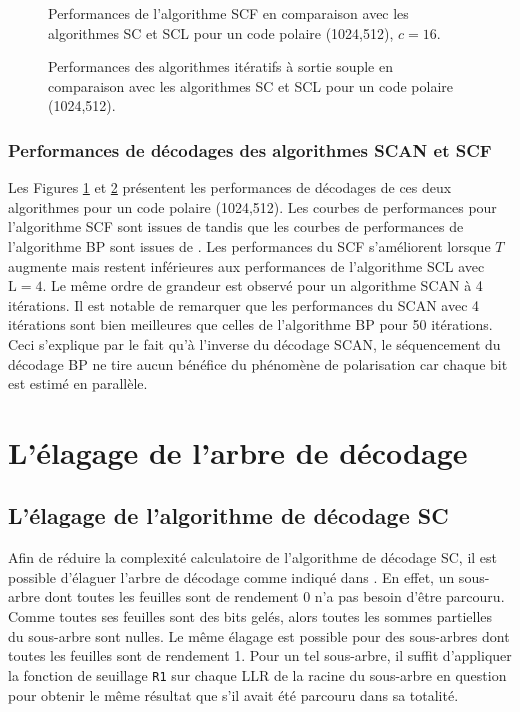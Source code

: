 \begin{figure}[h]
  \centering
  
  \caption{Performances de l'algorithme SCF en comparaison avec les algorithmes SC et SCL pour un code polaire (1024,512), $c=16$.}
  \label{fig:scf}
\end{figure}
\begin{figure}[h]
  \centering
  
  \caption{Performances des algorithmes itératifs à sortie souple en comparaison avec les algorithmes SC et SCL pour un code polaire (1024,512).}
  \label{fig:bp_scan}
\end{figure}
\subsubsection{Performances de décodages des algorithmes SCAN et SCF}
Les Figures \ref{fig:scf} et \ref{fig:bp_scan} présentent les performances de décodages de ces deux algorithmes pour un code polaire (1024,512). Les courbes de performances pour l'algorithme SCF sont issues de \cite{afisiadis_low-complexity_2014} tandis que les courbes de performances de l'algorithme BP sont issues de \cite{pamuk_fpga_2011}. Les performances du SCF s'améliorent lorsque $T$ augmente mais restent inférieures aux performances de l'algorithme SCL avec $\mathrm{L}=4$. Le même ordre de grandeur est observé pour un algorithme SCAN à 4 itérations. Il est notable de remarquer que les performances du SCAN avec 4 itérations sont bien meilleures que celles de l'algorithme BP pour 50 itérations. Ceci s'explique par le fait qu'à l'inverse du décodage SCAN, le séquencement du décodage BP ne tire aucun bénéfice du phénomène de polarisation car chaque bit est estimé en parallèle.

\section{L'élagage de l'arbre de décodage}


\subsection{L'élagage de l'algorithme de décodage SC}
Afin de réduire la complexité calculatoire de l'algorithme de décodage SC, il est possible d'élaguer l'arbre de décodage comme indiqué dans \cite{alamdar-yazdi_simplified_2011}. En effet, un sous-arbre dont toutes les feuilles sont de rendement 0 n'a pas besoin d'être parcouru. Comme toutes ses feuilles sont des bits gelés, alors toutes les sommes partielles du sous-arbre sont nulles. Le même élagage est possible pour des sous-arbres dont toutes les feuilles sont de rendement 1. Pour un tel sous-arbre, il suffit d'appliquer la fonction de seuillage \texttt{R1} sur chaque LLR de la racine du sous-arbre en question pour obtenir le même résultat que s'il avait été parcouru dans sa totalité.

